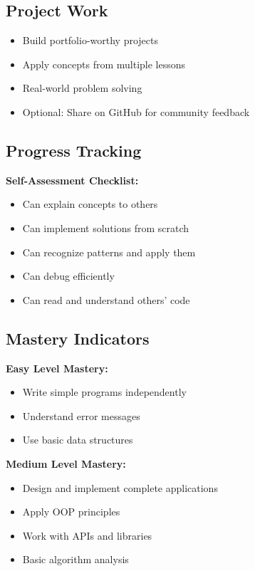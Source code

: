 \documentclass[11pt,letterpaper]{article}
\begin{document}
\subsection{Project Work}
\begin{itemize}[leftmargin=*]
    \item Build portfolio-worthy projects
    \item Apply concepts from multiple lessons
    \item Real-world problem solving
    \item Optional: Share on GitHub for community feedback
\end{itemize}

\subsection{Progress Tracking}
\textbf{Self-Assessment Checklist:}
\begin{itemize}[leftmargin=*]
    \item Can explain concepts to others
    \item Can implement solutions from scratch
    \item Can recognize patterns and apply them
    \item Can debug efficiently
    \item Can read and understand others' code
\end{itemize}

\subsection{Mastery Indicators}
\textbf{Easy Level Mastery:}
\begin{itemize}[leftmargin=*]
    \item Write simple programs independently
    \item Understand error messages
    \item Use basic data structures
\end{itemize}

\textbf{Medium Level Mastery:}
\begin{itemize}[leftmargin=*]
    \item Design and implement complete applications
    \item Apply OOP principles
    \item Work with APIs and libraries
    \item Basic algorithm analysis
\end{itemize}
\end{document}
